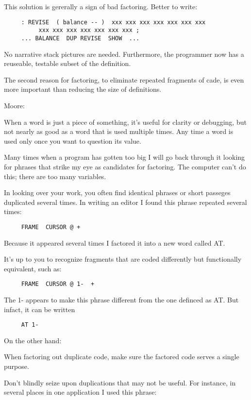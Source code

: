 This solution is gererally a sign of bad factoring. Better to write:
\begin{verbatim}
     : REVISE  ( balance -- )  xxx xxx xxx xxx xxx xxx xxx
          xxx xxx xxx xxx xxx xxx xxx ;
     ... BALANCE  DUP REVISE  SHOW  ...
\end{verbatim}
No narrative stack pictures are needed. Furthermore, the programmer now has a reuseable, testable subset of the definition.

\begin{tip}
The second reason for factoring, to eliminate repeated fragments of cade, is even more important than reducing the size of definitions.
\end{tip}

\bigskip
\blackline{2ex}
\noindent Moore:

\begin{tfquot}
When a word is just a piece of something, it's useful for clarity or debugging, but not nearly as good as a word that is used multiple times. Any time a word is used only once you want to question its value.

Many times when a program has gotten too big I will go back through it looking for phrases that strike my eye as candidates for factoring. The computer can't do this; there are too many variables.
\end{tfquot}
\blackline{1ex}
In looking over your work, you often find identical phrases or short passeges duplicated several times. In writing an editor I found this phrase repeated several times:

\begin{verbatim}
     FRAME  CURSOR @ +
\end{verbatim}
Because it appeared several times I factored it into a new word called AT.

It's up to you to recognize fragments that are coded differently but functionally equivalent, such as:

\begin{verbatim}
     FRAME  CURSOR @ 1-  +
\end{verbatim}
The 1- appears to make this phrase different from the one definced as AT. But infact, it can be written

\begin{verbatim}
     AT 1-
\end{verbatim}
On the other hand:

\begin{tip}
When factoring out duplicate code, make sure the factored code serves a single purpose.
\end{tip}
Don't blindly seize upon duplications that may not be useful. For instance, in several places in one application I used this phrase:

